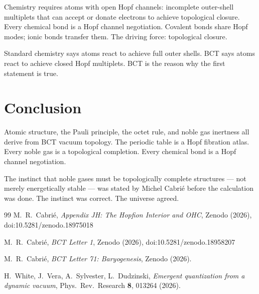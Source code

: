 \documentclass[aps,prl,twocolumn,showpacs,superscriptaddress]{revtex4-2}
\begin{document}
Chemistry requires atoms with open Hopf channels: incomplete 
outer-shell multiplets that can accept or donate electrons to 
achieve topological closure. Every chemical bond is a Hopf channel 
negotiation. Covalent bonds share Hopf modes; ionic bonds transfer 
them. The driving force: topological closure.

Standard chemistry says atoms react to achieve full outer shells. 
BCT says atoms react to achieve closed Hopf multiplets. BCT is 
the reason why the first statement is true.

\section{Conclusion}

Atomic structure, the Pauli principle, the octet rule, and noble 
gas inertness all derive from BCT vacuum topology. The periodic 
table is a Hopf fibration atlas. Every noble gas is a topological 
completion. Every chemical bond is a Hopf channel negotiation.

\begin{acknowledgments}
The instinct that noble gases must be topologically complete 
structures --- not merely energetically stable --- was stated 
by Michel Cabri\'e before the calculation was done. 
The instinct was correct. The universe agreed.
\end{acknowledgments}

\begin{thebibliography}{99}
 M.~R.~Cabri\'e, \textit{Appendix JH: The Hopfion 
Interior and OHC}, Zenodo (2026), doi:10.5281/zenodo.18975018

 M.~R.~Cabri\'e, \textit{BCT Letter 1}, Zenodo (2026), 
doi:10.5281/zenodo.18958207

 M.~R.~Cabri\'e, \textit{BCT Letter 71: Baryogenesis}, 
Zenodo (2026).

 H.~White, J.~Vera, A.~Sylvester, L.~Dudzinski, 
\textit{Emergent quantization from a dynamic vacuum}, 
Phys.\ Rev.\ Research \textbf{8}, 013264 (2026).
\end{thebibliography}
\end{document}
